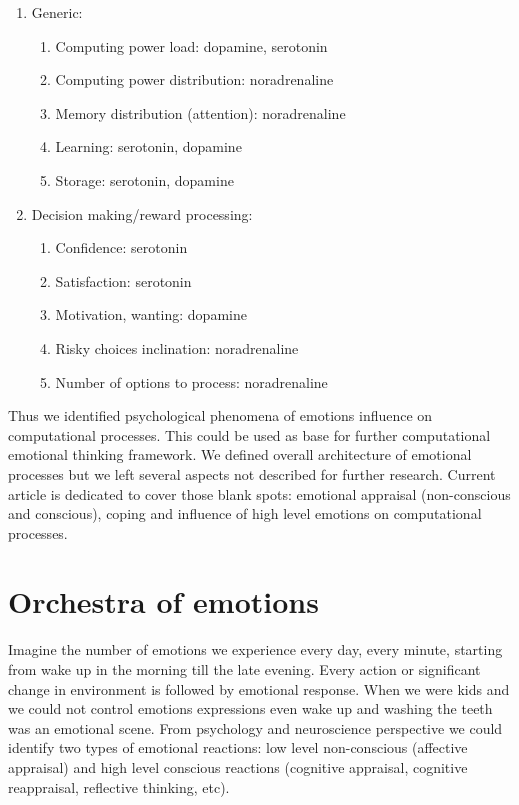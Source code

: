 \begin{enumerate}
 \item  Generic:
 \begin{enumerate}
  \item  Computing power load: dopamine, serotonin
  \item  Computing power distribution: noradrenaline
  \item  Memory distribution (attention): noradrenaline
  \item  Learning: serotonin, dopamine
  \item  Storage: serotonin, dopamine
 \end{enumerate}
 \item  Decision making/reward processing:
 \begin{enumerate}
  \item  Confidence: serotonin
  \item  Satisfaction: serotonin
  \item  Motivation, wanting: dopamine
  \item  Risky choices inclination: noradrenaline
  \item  Number of options to process: noradrenaline
 \end{enumerate}
\end{enumerate}

Thus we identified psychological phenomena of emotions influence on computational processes. This could be used as base for further computational emotional thinking framework. We defined overall architecture of emotional processes but we left several aspects not described for further research. Current article is dedicated to cover those blank spots: emotional appraisal (non-conscious and conscious), coping and influence of high level emotions on computational processes.

\section{Orchestra of emotions}

Imagine the number of emotions we experience every day, every minute, starting from wake up in the morning till the late evening. Every action or significant change in environment is followed by emotional response. When we were kids and we could not control emotions expressions even wake up and washing the teeth was an emotional scene. From psychology and neuroscience perspective \cite{emotionsbraintorobot, neuromodulatory, natureofemotions, primer_affect_psychology} we could identify two types of emotional reactions: low level non-conscious (affective appraisal) and high level conscious reactions (cognitive appraisal, cognitive reappraisal, reflective thinking, etc).

